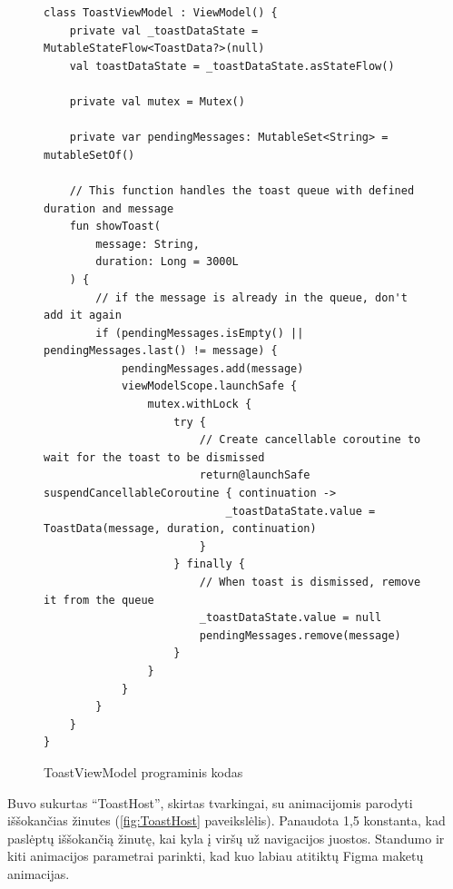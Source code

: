 \begin{figure}[htbp!]
    \centering
    \begin{verbatim}
class ToastViewModel : ViewModel() {
    private val _toastDataState = MutableStateFlow<ToastData?>(null)
    val toastDataState = _toastDataState.asStateFlow()

    private val mutex = Mutex()

    private var pendingMessages: MutableSet<String> = mutableSetOf()

    // This function handles the toast queue with defined duration and message
    fun showToast(
        message: String,
        duration: Long = 3000L
    ) {
        // if the message is already in the queue, don't add it again
        if (pendingMessages.isEmpty() || pendingMessages.last() != message) {
            pendingMessages.add(message)
            viewModelScope.launchSafe {
                mutex.withLock {
                    try {
                        // Create cancellable coroutine to wait for the toast to be dismissed
                        return@launchSafe suspendCancellableCoroutine { continuation ->
                            _toastDataState.value = ToastData(message, duration, continuation)
                        }
                    } finally {
                        // When toast is dismissed, remove it from the queue
                        _toastDataState.value = null
                        pendingMessages.remove(message)
                    }
                }
            }
        }
    }
}
    \end{verbatim}
    \caption{ToastViewModel programinis kodas}
    \label{fig:ToastViewModel}
\end{figure}

\newpage
Buvo sukurtas \enquote{ToastHost}, skirtas tvarkingai, su animacijomis parodyti iššokančias žinutes  (\ref{fig:ToastHost} paveikslėlis). Panaudota 1,5 konstanta, kad paslėptų iššokančią žinutę, kai kyla į viršų už navigacijos juostos. Standumo ir kiti animacijos parametrai parinkti, kad kuo labiau atitiktų Figma maketų animacijas.

